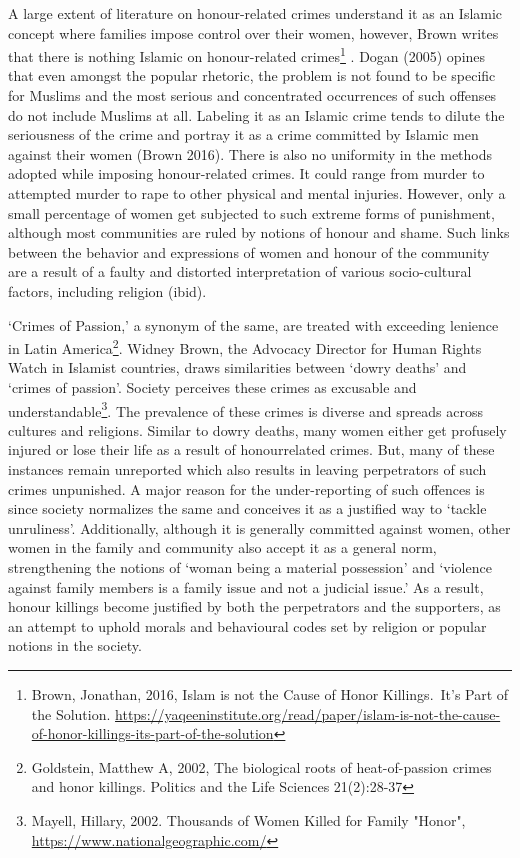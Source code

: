 \begin{multicols}{2}
\noi
A large extent of literature on honour-related crimes understand it as an Islamic concept
where families impose control over their women, however, Brown writes that there is
nothing Islamic on honour-related crimes\footnote{Brown, Jonathan, 2016, Islam is not the Cause of Honor Killings.~It’s Part of the Solution.
\url{https://yaqeeninstitute.org/read/paper/islam-is-not-the-cause-of-honor-killings-its-part-of-the-solution}}
. Dogan (2005) opines that even amongst the
popular rhetoric, the problem is not found to be specific for Muslims and the most
serious and concentrated occurrences of such offenses do not include Muslims at all.
Labeling it as an Islamic crime tends to dilute the seriousness of the crime and portray
it as a crime committed by Islamic men against their women (Brown 2016). There is
also no uniformity in the methods adopted while imposing honour-related crimes. It
could range from murder to attempted murder to rape to other physical and mental
injuries. However, only a small percentage of women get subjected to such extreme
forms of punishment, although most communities are ruled by notions of honour and
shame. Such links between the behavior and expressions of women and honour of the
community are a result of a faulty and distorted interpretation of various socio-cultural
factors, including religion (ibid). 


\newpage

\noi
‘Crimes of Passion,’ a synonym of the same, are treated with exceeding lenience in
Latin America\footnote{ Goldstein, Matthew A, 2002, The biological roots of heat-of-passion crimes and honor killings. Politics
and the Life Sciences 21(2):28-37}. Widney Brown, the Advocacy Director for Human Rights Watch in
Islamist countries, draws similarities between ‘dowry deaths’ and ‘crimes of passion’.
Society perceives these crimes as excusable and understandable\footnote{Mayell, Hillary, 2002. Thousands of Women Killed for Family "Honor",
\url{https://www.nationalgeographic.com/}}. The prevalence of
these crimes is diverse and spreads across cultures and religions. Similar to dowry
deaths, many women either get profusely injured or lose their life as a result of honourrelated crimes. But, many of these instances remain unreported which also results in
leaving perpetrators of such crimes unpunished. A major reason for the under-reporting
of such offences is since society normalizes the same and conceives it as a justified way
to ‘tackle unruliness’. Additionally, although it is generally committed against women,
other women in the family and community also accept it as a general norm,
strengthening the notions of ‘woman being a material possession’ and ‘violence against
family members is a family issue and not a judicial issue.’ As a result, honour killings become justified by both the perpetrators and the supporters, as an attempt to uphold
morals and behavioural codes set by religion or popular notions in the society.


\end{multicols}
